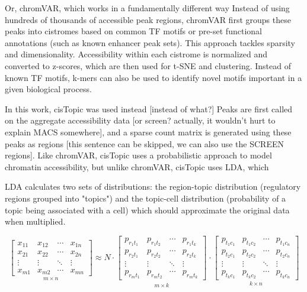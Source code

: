 Or, chromVAR, which works in a fundamentally different way Instead of using hundreds of thousands of accessible peak regions, chromVAR first groups these peaks into cistromes based on common TF motifs or pre-set functional annotations (such as known enhancer peak sets). This approach tackles sparsity and dimensionality. Accessibility within each cistrome is normalized and converted to z-scores, which are then used for t-SNE and clustering. Instead of known TF motifs, k-mers can also be used to identify novel motifs important in a given biological process.

In this work, cisTopic was used instead [instead of what?] Peaks are first called on the aggregate accessibility data [or screen? actually, it wouldn't hurt to explain MACS somewhere], and a sparse count matrix is generated using these peaks as regions [this sentence can be skipped, we can also use the SCREEN regions]. Like chromVAR, cisTopic uses a probabilistic approach to model chromatin accessibility, but unlike chromVAR, cisTopic uses LDA, which

LDA calculates two sets of distributions: the region-topic distribution (regulatory regions grouped into "topics") and the topic-cell distribution (probability of a topic being associated with a cell) which should approximate the original data when multiplied.

\[
	\underset{m \times n}{
		\begin{bmatrix}
			x_{11} & x_{12} & \cdots & x_{1n} \\
			x_{21} & x_{22} & \cdots & x_{2n} \\
			\vdots & \vdots & \ddots & \vdots \\
			x_{m1} & x_{m2} & \cdots & x_{mn}
		\end{bmatrix}}
	\approx
	N \cdot
	\underset{m \times k}{
	\begin{bmatrix}
		p_{r_1t_1} & p_{r_1t_2} & \cdots & p_{r_1t_k} \\
		p_{r_2t_1} & p_{r_2t_2} & \cdots & p_{r_2t_k} \\
		\vdots     & \vdots     & \ddots & \vdots     \\
		p_{r_mt_1} & p_{r_mt_2} & \cdots & p_{r_mt_k}
	\end{bmatrix}_{}}
	\cdot
	\underset{k \times n}{
		\begin{bmatrix}
			p_{t_1c_1} & p_{t_1c_2} & \cdots & p_{t_1c_n} \\
			p_{t_2c_1} & p_{t_2c_2} & \cdots & p_{t_2c_n} \\
			\vdots     & \vdots     & \ddots & \vdots     \\
			p_{t_kc_1} & p_{t_kc_2} & \cdots & p_{t_kc_n}
		\end{bmatrix}}
\]


